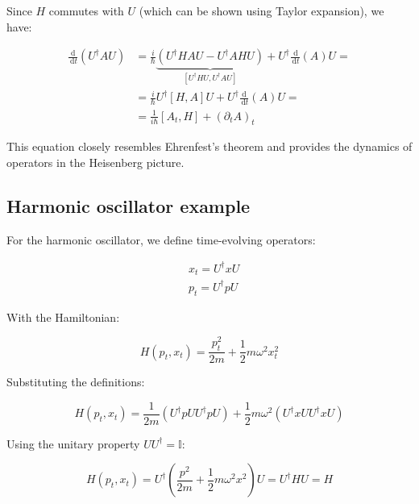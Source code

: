 \documentclass[italian]{HKNdocument}
\begin{document}
Since $H$ commutes with $U$ (which can be shown using Taylor expansion), we have:

\begin{align}
\frac{\mathrm{d}}{\, \mathrm{d} t}\left(U^{\dagger} A U\right) & =\frac{i}{\hbar} \underbrace{\left(U^{\dagger} H A U-U^{\dagger} A H U\right)}_{\left[U^{\dagger}HU, U^{\dagger}AU\right]}+U^{\dagger} \frac{\, \mathrm{d}}{\, \mathrm{d} t}(A) U= \\
& =\frac{i}{\hbar} U^{\dagger}[H,A]U + U^{\dagger} \frac{\mathrm{d}}{\, \mathrm{d} t}(A) U= \\
& =\frac{1}{i \hbar}\left[A_{t}, H\right]+\left(\partial_{t} A\right)_{t} \label{eq:10.42}
\end{align}

This equation closely resembles Ehrenfest's theorem and provides the dynamics of operators in the Heisenberg picture.

\subsection{Harmonic oscillator example}
For the harmonic oscillator, we define time-evolving operators:

\begin{align}
& x_{t}=U^{\dagger} x U \\
& p_{t}=U^{\dagger} p U \label{eq:10.43}
\end{align}

With the Hamiltonian:

\begin{equation}
H\left(p_{t}, x_{t}\right)=\frac{p_{t}^{2}}{2 m}+\frac{1}{2} m \omega^{2} x_{t}^{2} \label{eq:10.44}
\end{equation}

Substituting the definitions:

\begin{equation}
H\left(p_{t}, x_{t}\right)=\frac{1}{2 m}\left(U^{\dagger} p U U^{\dagger} p U\right) + \frac{1}{2} m \omega^{2}\left(U^{\dagger} x U U^{\dagger} x U\right) \label{eq:10.45}
\end{equation}

Using the unitary property $U U^{\dagger}=\mathbb{I}$:

\begin{equation}
H\left(p_{t}, x_{t}\right)=U^{\dagger}\left(\frac{p^{2}}{2 m}+\frac{1}{2} m \omega^{2} x^{2}\right) U=U^{\dagger} H U=H \label{eq:10.46}
\end{equation}
\end{document}
